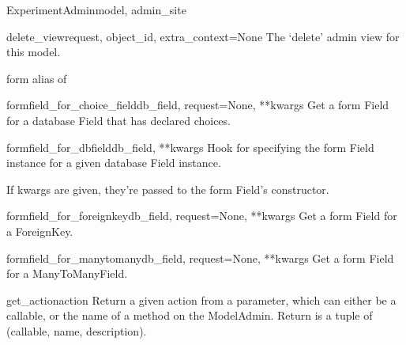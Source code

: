 \documentclass[letterpaper,10pt,english]{sphinxmanual}
\begin{document}
\begin{classdesc}{ExperimentAdmin}{model, admin\_site}
\hypertarget{data.admin.ExperimentAdmin.delete_view}{}\begin{methoddesc}{delete\_view}{request, object\_id, extra\_context=None}
The `delete' admin view for this model.
\end{methoddesc}

\hypertarget{data.admin.ExperimentAdmin.form}{}\begin{memberdesc}{form}
alias of 
\end{memberdesc}

\hypertarget{data.admin.ExperimentAdmin.formfield_for_choice_field}{}\begin{methoddesc}{formfield\_for\_choice\_field}{db\_field, request=None, **kwargs}
Get a form Field for a database Field that has declared choices.
\end{methoddesc}

\hypertarget{data.admin.ExperimentAdmin.formfield_for_dbfield}{}\begin{methoddesc}{formfield\_for\_dbfield}{db\_field, **kwargs}
Hook for specifying the form Field instance for a given database Field
instance.

If kwargs are given, they're passed to the form Field's constructor.
\end{methoddesc}

\hypertarget{data.admin.ExperimentAdmin.formfield_for_foreignkey}{}\begin{methoddesc}{formfield\_for\_foreignkey}{db\_field, request=None, **kwargs}
Get a form Field for a ForeignKey.
\end{methoddesc}

\hypertarget{data.admin.ExperimentAdmin.formfield_for_manytomany}{}\begin{methoddesc}{formfield\_for\_manytomany}{db\_field, request=None, **kwargs}
Get a form Field for a ManyToManyField.
\end{methoddesc}

\hypertarget{data.admin.ExperimentAdmin.get_action}{}\begin{methoddesc}{get\_action}{action}
Return a given action from a parameter, which can either be a callable,
or the name of a method on the ModelAdmin.  Return is a tuple of
(callable, name, description).
\end{methoddesc}


\end{classdesc}
\end{document}
